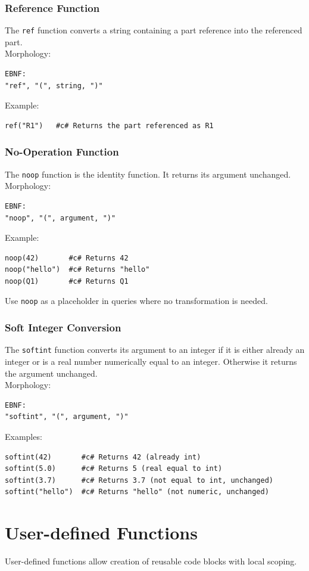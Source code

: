 \documentclass{report}
\begin{document}
\subsubsection{Reference Function}
The \texttt{ref} function converts a string containing a part reference into the referenced part. \\
Morphology:
\begin{verbatim}
EBNF:
"ref", "(", string, ")"
\end{verbatim}
Example:
\begin{verbatim}
ref("R1")   #c# Returns the part referenced as R1
\end{verbatim}

\subsubsection{No-Operation Function}
The \texttt{noop} function is the identity function. It returns its argument unchanged. \\
Morphology:
\begin{verbatim}
EBNF:
"noop", "(", argument, ")"
\end{verbatim}
Example:
\begin{verbatim}
noop(42)       #c# Returns 42
noop("hello")  #c# Returns "hello"
noop(Q1)       #c# Returns Q1
\end{verbatim}
Use \texttt{noop} as a placeholder in queries where no transformation is needed.

\subsubsection{Soft Integer Conversion}
The \texttt{softint} function converts its argument to an integer if it is either already an integer or is a real number numerically equal to an integer. Otherwise it returns the argument unchanged. \\
Morphology:
\begin{verbatim}
EBNF:
"softint", "(", argument, ")"
\end{verbatim}
Examples:
\begin{verbatim}
softint(42)       #c# Returns 42 (already int)
softint(5.0)      #c# Returns 5 (real equal to int)
softint(3.7)      #c# Returns 3.7 (not equal to int, unchanged)
softint("hello")  #c# Returns "hello" (not numeric, unchanged)
\end{verbatim}

\section{User-defined Functions}
User-defined functions allow creation of reusable code blocks with local scoping.
\end{document}
